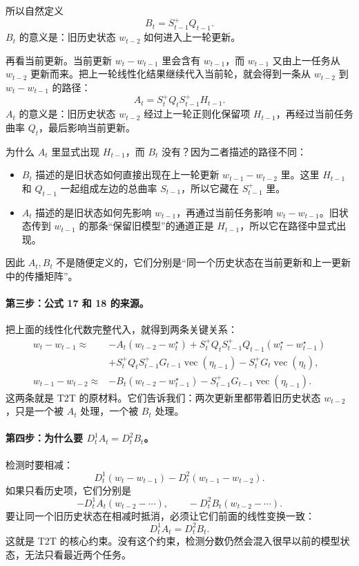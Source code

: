 \documentclass[UTF8,fontset=none,11pt]{ctexart}
\theoremstyle{cnstyle}
\newcommand{\vect}{\operatorname{vec}}
\begin{document}
所以自然定义
\[
  B_t=S_{t-1}^+Q_{t-1}.
\]
\(B_t\) 的意义是：旧历史状态 \(w_{t-2}\) 如何进入上一轮更新。

再看当前更新。当前更新 \(w_t-w_{t-1}\) 里会含有 \(w_{t-1}\)，而 \(w_{t-1}\) 又由上一任务从 \(w_{t-2}\) 更新而来。把上一轮线性化结果继续代入当前轮，就会得到一条从 \(w_{t-2}\) 到 \(w_t-w_{t-1}\) 的路径：
\[
  A_t=S_t^+Q_tS_{t-1}^+H_{t-1}.
\]
\(A_t\) 的意义是：旧历史状态 \(w_{t-2}\) 经过上一轮正则化保留项 \(H_{t-1}\)，再经过当前任务曲率 \(Q_t\)，最后影响当前更新。

为什么 \(A_t\) 里显式出现 \(H_{t-1}\)，而 \(B_t\) 没有？因为二者描述的路径不同：
\begin{itemize}
  \item \(B_t\) 描述的是旧状态如何直接出现在上一轮更新 \(w_{t-1}-w_{t-2}\) 里。这里 \(H_{t-1}\) 和 \(Q_{t-1}\) 一起组成左边的总曲率 \(S_{t-1}\)，所以它藏在 \(S_{t-1}^+\) 里。
  \item \(A_t\) 描述的是旧状态如何先影响 \(w_{t-1}\)，再通过当前任务影响 \(w_t-w_{t-1}\)。旧状态传到 \(w_{t-1}\) 的那条“保留旧模型”的通道正是 \(H_{t-1}\)，所以它在路径中显式出现。
\end{itemize}

因此 \(A_t,B_t\) 不是随便定义的，它们分别是“同一个历史状态在当前更新和上一更新中的传播矩阵”。

\paragraph{第三步：公式 17 和 18 的来源。}
把上面的线性化代数完整代入，就得到两条关键关系：
\begin{align*}
  w_t-w_{t-1}
  \approx&
  -A_t(w_{t-2}-w_t^\star)
  +S_t^+Q_tS_{t-1}^+Q_{t-1}(w_t^\star-w_{t-1}^\star)\\
  &+
  S_t^+Q_tS_{t-1}^+G_{t-1}\vect(\eta_{t-1})
  -S_t^+G_t\vect(\eta_t),
  \\
  w_{t-1}-w_{t-2}
  \approx&
  -B_t(w_{t-2}-w_{t-1}^\star)
  -S_{t-1}^+G_{t-1}\vect(\eta_{t-1}).
\end{align*}
这两条就是 T2T 的原材料。它们告诉我们：两次更新里都带着旧历史状态 \(w_{t-2}\)，只是一个被 \(A_t\) 处理，一个被 \(B_t\) 处理。

\paragraph{第四步：为什么要 \(D_t^1A_t=D_t^2B_t\)。}
检测时要相减：
\[
  D_t^1(w_t-w_{t-1})-D_t^2(w_{t-1}-w_{t-2}).
\]
如果只看历史项，它们分别是
\[
  -D_t^1A_t(w_{t-2}-\cdots),
  \qquad
  -D_t^2B_t(w_{t-2}-\cdots).
\]
要让同一个旧历史状态在相减时抵消，必须让它们前面的线性变换一致：
\[
  D_t^1A_t=D_t^2B_t.
\]
这就是 T2T 的核心约束。没有这个约束，检测分数仍然会混入很早以前的模型状态，无法只看最近两个任务。
\end{document}
